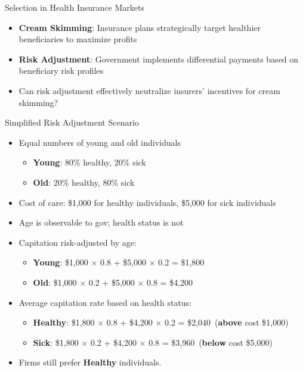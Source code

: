 \documentclass[professionalfonts, aspectratio=169]{beamer}
\begin{document}
\begin{frame}{Selection in Health Insurance Markets}
  \begin{itemize}
    \item \textbf{Cream Skimming}: Insurance plans strategically target healthier beneficiaries to maximize profits
    \item \textbf{Risk Adjustment}: Government implements differential payments based on beneficiary risk profiles
    \item Can risk adjustment effectively neutralize insurers' incentives for cream skimming?
  \end{itemize}
\end{frame}

\begin{frame}{Simplified Risk Adjustment Scenario}
  \begin{itemize}
    \item Equal numbers of young and old individuals
    \begin{itemize}
      \item \textbf{Young}: 80\% healthy, 20\% sick
      \item \textbf{Old}: 20\% healthy, 80\% sick
    \end{itemize}
    \item Cost of care: \$1,000 for healthy individuals, \$5,000 for sick individuals
    \item Age is observable to gov; health status is not \pause
    \item Capitation risk-adjusted by age:
    \begin{itemize}
      \item \textbf{Young}: \$1,000 $\times$ 0.8 + \$5,000 $\times$ 0.2 = \$1,800
      \item \textbf{Old}: \$1,000 $\times$ 0.2 + \$5,000 $\times$ 0.8 = \$4,200
    \end{itemize}
    \item Average capitation rate based on health status:
    \begin{itemize}
      \item \textbf{Healthy}: \$1,800 $\times$ 0.8 + \$4,200 $\times$ 0.2 = \$2,040\ (\textbf{above} cost \$1,000)
      \item \textbf{Sick}: \$1,800 $\times$ 0.2 + \$4,200 $\times$ 0.8 = \$3,960\ (\textbf{below} cost \$5,000)
    \end{itemize}
    \item Firms still prefer \textbf{Healthy} individuals.
  \end{itemize}
\end{frame}
\end{document}
